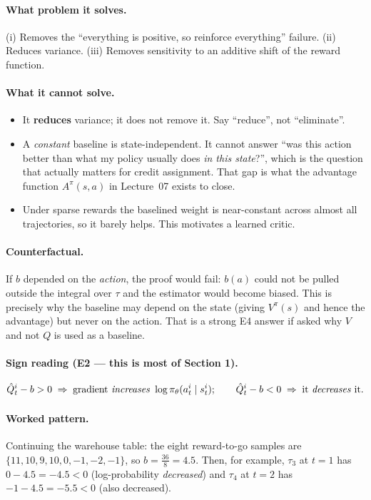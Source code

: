 \documentclass[11pt,a4paper]{article}
\begin{document}
\paragraph{What problem it solves.} (i) Removes the ``everything is positive,
so reinforce everything'' failure. (ii) Reduces variance. (iii) Removes
sensitivity to an additive shift of the reward function.

\paragraph{What it cannot solve.}
\begin{itemize}
\item It \textbf{reduces} variance; it does not remove it. Say ``reduce'', not
``eliminate''.
\item A \emph{constant} baseline is state-independent. It cannot answer ``was
this action better than what my policy usually does \emph{in this state}?'',
which is the question that actually matters for credit assignment. That gap is
what the advantage function $A^\pi(s,a)$ in Lecture~07 exists to close.
\item Under sparse rewards the baselined weight is near-constant across almost
all trajectories, so it barely helps. This motivates a learned critic.
\end{itemize}

\paragraph{Counterfactual.} If $b$ depended on the \emph{action}, the proof
would fail: $b(a)$ could not be pulled outside the integral over $\tau$ and
the estimator would become biased. This is precisely why the baseline may
depend on the state (giving $V^\pi(s)$ and hence the advantage) but never on
the action. That is a strong E4 answer if asked why $V$ and not $Q$ is used as
a baseline.

\paragraph{Sign reading (E2 --- this is most of Section 1).}
\[
\hat Q^i_t - b > 0 \;\Rightarrow\; \text{gradient \emph{increases} } \log\pi_\theta(a^i_t\mid s^i_t);
\qquad
\hat Q^i_t - b < 0 \;\Rightarrow\; \text{it \emph{decreases} it.}
\]

\paragraph{Worked pattern.} Continuing the warehouse table: the eight
reward-to-go samples are $\{11,10,9,10,0,-1,-2,-1\}$, so
$b=\tfrac{36}{8}=4.5$. Then, for example, $\tau_3$ at $t=1$ has
$0-4.5=-4.5<0$ (log-probability \emph{decreased}) and $\tau_4$ at $t=2$ has
$-1-4.5=-5.5<0$ (also decreased).
\end{document}
